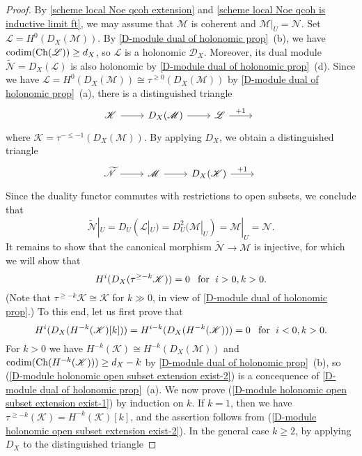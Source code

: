 \begin{proof}
By \cref{scheme local Noe qcoh extension} and \cref{scheme local Noe qcoh is inductive limit ft}, we may assume that $\mathscr{M}$ is coherent and $\mathscr{M}|_U=\mathscr{N}$. Set $\mathscr{L}=H^0(D_X(\mathscr{M}))$. By \cref{D-module dual of holonomic prop}~(b), we have $\mathrm{codim}(\mathrm{Ch}(\mathscr{L}))\geq d_X$, so $\mathscr{L}$ is a holonomic $\mathscr{D}_X$. Moreover, its dual module $\widetilde{\mathscr{N}}=D_X(\mathscr{L})$ is also holonomic by \cref{D-module dual of holonomic prop}~(d). Since we have $\mathscr{L}=H^0(D_X(\mathscr{M}))\cong\tau^{\geq 0}(D_X(\mathscr{M}))$ by \cref{D-module dual of holonomic prop}~(a), there is a distinguished triangle
\[\begin{tikzcd}
\mathscr{K}\ar[r]&D_X(\mathscr{M})\ar[r]&\mathscr{L}\ar[r,"+1"]&{}
\end{tikzcd}\]
where $\mathscr{K}=\tau^{-\leq -1}(D_X(\mathscr{M}))$. By applying $D_X$, we obtain a distinguished triangle
\[\begin{tikzcd}
\widetilde{\mathscr{N}}\ar[r]&\mathscr{M}\ar[r]&D_X(\mathscr{K})\ar[r,"+1"]&{}
\end{tikzcd}\]
Since the duality functor commutes with restrictions to open subsets, we conclude that
\[\widetilde{\mathscr{N}}|_U=D_U(\mathscr{L}|_U)=D_U^2(\mathscr{M}|_U)=\mathscr{M}|_U=\mathscr{N}.\]
It remains to show that the canonical morphism $\widetilde{\mathscr{N}}\to\mathscr{M}$ is injective, for which we will show that
\begin{equation}\label{D-module holonomic open subset extension exist-1}
H^i(D_X(\tau^{\geq-k}\mathscr{K}))=0\hspace{8pt}\text{for}\hspace{6pt} i>0,k>0.
\end{equation}
(Note that $\tau^{\geq-k}\mathscr{K}\cong\mathscr{K}$ for $k\gg 0$, in view of \cref{D-module dual of holonomic prop}.) To this end, let us first prove that
\begin{equation}\label{D-module holonomic open subset extension exist-2}
H^i(D_X(H^{-k}(\mathscr{K})[k]))=H^{i-k}(D_X(H^{-k}(\mathscr{K})))=0\hspace{8pt}\text{for}\hspace{6pt} i<0,k>0.
\end{equation}
For $k>0$ we have $H^{-k}(\mathscr{K})\cong H^{-k}(D_X(\mathscr{M}))$ and $\mathrm{codim}(\mathrm{Ch}(H^{-k}(\mathscr{K})))\geq d_X-k$ by \cref{D-module dual of holonomic prop}~(b), so (\ref{D-module holonomic open subset extension exist-2}) is a concequence of \cref{D-module dual of holonomic prop}~(a). We now prove (\ref{D-module holonomic open subset extension exist-1}) by induction on $k$. If $k=1$, then we have $\tau^{\geq-k}(\mathscr{K})=H^{-k}(\mathscr{K})[k]$, and the assertion follows from (\ref{D-module holonomic open subset extension exist-2}). In the general case $k\geq 2$, by applying $D_X$ to the distinguished triangle

\end{proof}
